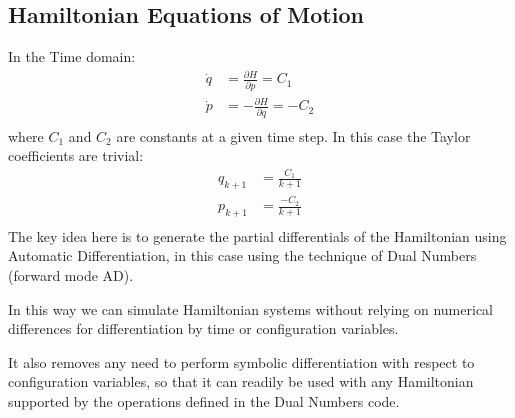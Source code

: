 \documentclass[11pt]{article}
\begin{document}
\subsection{Hamiltonian Equations of Motion}
In the Time domain:
\begin{equation}
\begin{aligned}
\dot{q} &= \frac {\partial H} {\partial p} = C_1 \\
\dot{p} &= - \frac {\partial H} {\partial q} = - C_2 \\
\end{aligned}
\end{equation}
where $C_1$ and $C_2$ are constants at a given time step.
In this case the Taylor coefficients are trivial:
\begin{equation}
\begin{aligned}
q_{k+1} &= \frac {C_1} {k + 1} \\
p_{k+1} &= \frac {- C_2} {k + 1} \\
\end{aligned}
\end{equation}
The key idea here is to generate the partial differentials of the Hamiltonian using Automatic Differentiation, in this case using the technique of Dual Numbers (forward mode AD).

In this way we can simulate Hamiltonian systems without relying on numerical differences for differentiation by time or configuration variables.

It also removes any need to perform symbolic differentiation with respect to configuration variables, so that it can readily be used with any Hamiltonian supported by the operations defined in the Dual Numbers code.
\end{document}
